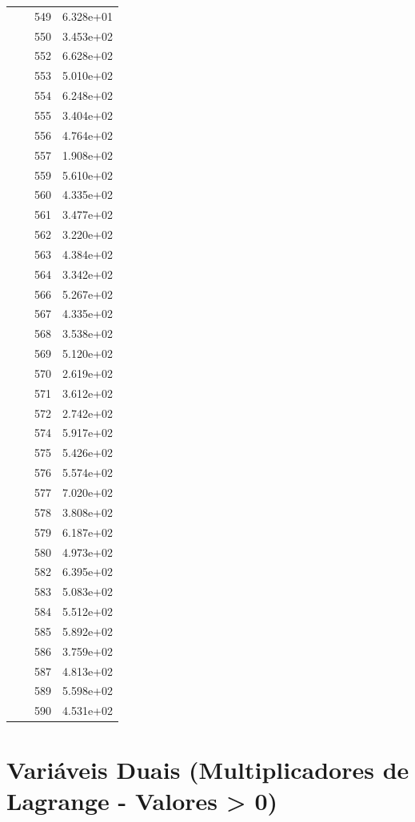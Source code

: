 \documentclass[12pt]{article}
\begin{document}
\begin{longtable}{@{}cccc@{}}
 &  & 549 & 6.328e+01 \\
 &  & 550 & 3.453e+02 \\
 &  & 552 & 6.628e+02 \\
 &  & 553 & 5.010e+02 \\
 &  & 554 & 6.248e+02 \\
 &  & 555 & 3.404e+02 \\
 &  & 556 & 4.764e+02 \\
 &  & 557 & 1.908e+02 \\
 &  & 559 & 5.610e+02 \\
 &  & 560 & 4.335e+02 \\
 &  & 561 & 3.477e+02 \\
 &  & 562 & 3.220e+02 \\
 &  & 563 & 4.384e+02 \\
 &  & 564 & 3.342e+02 \\
 &  & 566 & 5.267e+02 \\
 &  & 567 & 4.335e+02 \\
 &  & 568 & 3.538e+02 \\
 &  & 569 & 5.120e+02 \\
 &  & 570 & 2.619e+02 \\
 &  & 571 & 3.612e+02 \\
 &  & 572 & 2.742e+02 \\
 &  & 574 & 5.917e+02 \\
 &  & 575 & 5.426e+02 \\
 &  & 576 & 5.574e+02 \\
 &  & 577 & 7.020e+02 \\
 &  & 578 & 3.808e+02 \\
 &  & 579 & 6.187e+02 \\
 &  & 580 & 4.973e+02 \\
 &  & 582 & 6.395e+02 \\
 &  & 583 & 5.083e+02 \\
 &  & 584 & 5.512e+02 \\
 &  & 585 & 5.892e+02 \\
 &  & 586 & 3.759e+02 \\
 &  & 587 & 4.813e+02 \\
 &  & 589 & 5.598e+02 \\
 &  & 590 & 4.531e+02 \\

\bottomrule
\end{longtable}


\section{Variáveis Duais (Multiplicadores de Lagrange - Valores > 0)}
\end{document}
